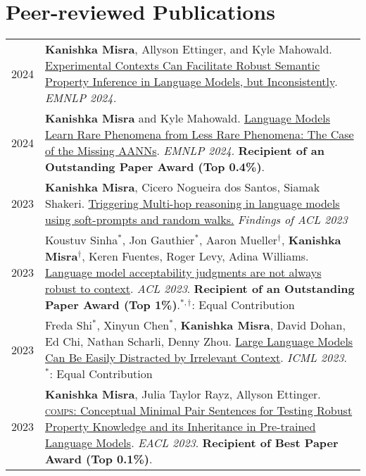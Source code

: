 \documentclass[11pt]{article}
\begin{document}
\section*{Peer-reviewed Publications}
\vspace{-1.5em}
\renewcommand*{\arraystretch}{1.5}
\begin{longtable}{p{}  p{} }

2024 & \textbf{Kanishka Misra}, Allyson Ettinger, and Kyle Mahowald. \href{https://arxiv.org/abs/2401.06640v1}{Experimental Contexts Can Facilitate Robust Semantic Property Inference in Language Models, but Inconsistently}. \textit{EMNLP 2024.}\\

2024 & \textbf{Kanishka Misra} and Kyle Mahowald. \href{https://arxiv.org/abs/2403.19827}{Language Models Learn Rare Phenomena from Less Rare Phenomena: The Case of the Missing AANNs}. \textit{EMNLP 2024}. \textcolor{award}{\textbf{Recipient of an Outstanding Paper Award (Top 0.4\%)}}.\\

2023 & \textbf{Kanishka Misra}, Cicero Nogueira dos Santos, Siamak Shakeri. \href{https://aclanthology.org/2023.findings-acl.62/}{Triggering Multi-hop reasoning in language models using soft-prompts and random walks.} \textit{Findings of ACL 2023}\\

2023 & Koustuv Sinha$^{*}$, Jon Gauthier$^{*}$, Aaron Mueller$^{\dagger}$, \textbf{Kanishka Misra}$^{\dagger}$, Keren Fuentes, Roger Levy, Adina Williams. \href{https://aclanthology.org/2023.acl-long.333/}{Language model acceptability judgments are not always robust to context}. \textit{ACL 2023}. \textcolor{award}{\textbf{Recipient of an Outstanding Paper Award (Top 1\%)}}.$^{*,\dagger}$: Equal Contribution\\

2023 & Freda Shi$^{*}$, Xinyun Chen$^{*}$, \textbf{Kanishka Misra}, David Dohan, Ed Chi, Nathan Scharli, Denny Zhou. \href{https://proceedings.mlr.press/v202/shi23a.html}{Large Language Models Can Be Easily Distracted by Irrelevant Context}. \textit{ICML 2023}. $^{*}$: Equal Contribution\\

2023 & \textbf{Kanishka Misra}, Julia Taylor Rayz, Allyson Ettinger. \href{https://aclanthology.org/2023.eacl-main.213}{\textsc{comps}: Conceptual Minimal Pair Sentences for Testing Robust Property Knowledge and its Inheritance in Pre-trained Language Models}. \textit{EACL 2023}. \textbf{\textcolor{award}{Recipient of Best Paper Award (Top 0.1\%)}}.\\


\end{longtable}
\end{document}

